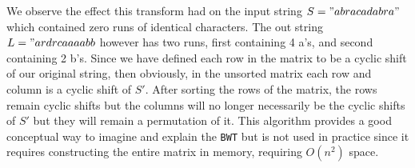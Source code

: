 \documentclass{article}
\begin{document}
We observe the effect this transform had on the input string \(S="abracadabra"\) which contained zero runs of identical characters. The out string \(L="ardrcaaaabb\) however has two runs, first containing 4 a's, and second containing 2 b's.
Since we have defined each row in the matrix to be a cyclic shift of our original string, then obviously, in the unsorted matrix each row and column is a cyclic shift of \(S'\). After sorting the rows of the matrix, the rows remain cyclic shifts but the columns will no longer necessarily be the cyclic shifts of \(S'\) but they will remain a permutation of it. %
This algorithm provides a good conceptual way to imagine and explain the \texttt{BWT} but is not used in practice since it requires constructing the entire matrix in memory, requiring \(O(n^2)\) space.
\end{document}
